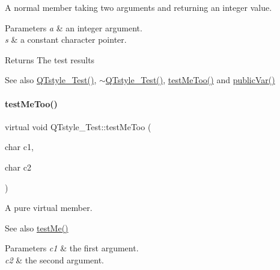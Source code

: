 A normal member taking two arguments and returning an integer value. 


\begin{DoxyParams}{Parameters}
{\em a} & an integer argument. \\
\hline
{\em s} & a constant character pointer. \\
\hline
\end{DoxyParams}
\begin{DoxyReturn}{Returns}
The test results 
\end{DoxyReturn}
\begin{DoxySeeAlso}{See also}
\hyperlink{class_q_tstyle___test_a14a296ea4e2ad446712f2310bec60766}{Q\+Tstyle\+\_\+\+Test()}, \hyperlink{class_q_tstyle___test_a7e82397d534d9a867f0857da01a46e9e}{$\sim$\+Q\+Tstyle\+\_\+\+Test()}, \hyperlink{class_q_tstyle___test_ad5b201f097a720d44bf976c2f27efbda}{test\+Me\+Too()} and \hyperlink{class_q_tstyle___test_aabf7b2e9ed83ea44aca4d213baae06d3}{public\+Var()} 
\end{DoxySeeAlso}
\mbox{\label{class_q_tstyle___test_ad5b201f097a720d44bf976c2f27efbda}} 
\paragraph{\texorpdfstring{test\+Me\+Too()}{testMeToo()}}
{\footnotesize\ttfamily virtual void Q\+Tstyle\+\_\+\+Test\+::test\+Me\+Too (\begin{DoxyParamCaption}\item[{char}]{c1,  }\item[{char}]{c2 }\end{DoxyParamCaption})\hspace{0.3cm}{\ttfamily [pure virtual]}}



A pure virtual member. 

\begin{DoxySeeAlso}{See also}
\hyperlink{class_q_tstyle___test_a8840748753118dd468e8368a28e49c62}{test\+Me()} 
\end{DoxySeeAlso}

\begin{DoxyParams}{Parameters}
{\em c1} & the first argument. \\
\hline
{\em c2} & the second argument. \\
\hline
\end{DoxyParams}


